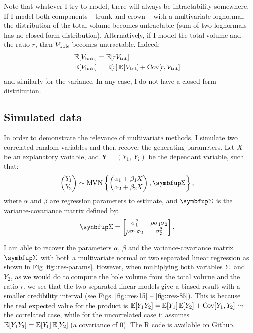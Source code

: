 \begin{tcolorbox}[breakable, title = Intractability]
Note that whatever I try to model, there will always be intractability somewhere. If I model both components -- trunk and crown -- with a multivariate lognormal, the distribution of the total volume becomes untractable (sum of two lognormals has no closed form distribution). Alternatively, if I model the total volume and the ratio \( r \), then \( V_{\text{bole}} \) becomes untractable. Indeed:
\begin{align*}
	\operatorname{\mathbb{E}}[V_{\text{bole}}] &= \operatorname{\mathbb{E}}[r V_{\text{tot}}] \\
	\operatorname{\mathbb{E}}[V_{\text{bole}}] &= \operatorname{\mathbb{E}}[r] \operatorname{\mathbb{E}}[V_{\text{tot}}] + \operatorname{Cov}[r, V_{\text{tot}}]
\end{align*}
and similarly for the variance. In any case, I do not have a closed-form distribution.
\end{tcolorbox}

\subsection{Simulated data}
In order to demonstrate the relevance of multivariate methods, I simulate two correlated random variables and then recover the generating parameters. Let \( X \) be an explanatory variable, and \( \mathbf{Y} = (Y_1, \, Y_2) \) be the dependant variable, such that:
\[
	\begin{pmatrix}
		Y_1 \\
		Y_2
	\end{pmatrix} \sim
	\MVN\left\{ \begin{pmatrix}
		\alpha_1 + \beta_1 X \\
		\alpha_2 + \beta_2 X \\
	\end{pmatrix}, \Sigmabf \right\},
\]
where \( \alpha \) and \( \beta \) are regression parameters to estimate, and \( \Sigmabf \) is the variance-covariance matrix defined by:
\[
	\Sigmabf = \begin{bmatrix}
		\sigma_1^2 & \rho \sigma_1 \sigma_2 \\
		\rho \sigma_1 \sigma_2 & \sigma_2^2
	\end{bmatrix}. \\
\]

I am able to recover the parameters \( \alpha \), \( \beta \) and the variance-covariance matrix \( \Sigmabf \) with both a multivariate normal or two separated linear regression as shown in Fig \ref{fig::res-params}. However, when multiplying both variables \( Y_1 \) and \( Y_2 \), as we would do to compute the bole volume from the total volume and the ratio \( r \), we see that the two separated linear models give a biased result with a smaller credibility interval (see Figs. \ref{fig::res-15} -- \ref{fig::res-85}). This is because the real expected value for the product is \( \operatorname{\mathbb{E}}[Y_1 Y_2] = \operatorname{\mathbb{E}}[Y_1] \operatorname{\mathbb{E}}[Y_2] + \operatorname{Cov}[Y_1, Y_2] \) in the correlated case, while for the uncorrelated case it assumes \( \operatorname{\mathbb{E}}[Y_1 Y_2] = \operatorname{\mathbb{E}}[Y_1] \operatorname{\mathbb{E}}[Y_2] \) (\ie a covariance of \num{0}). The R code is available on \href{https://github.com/amael-ls/emerge/tree/main/communications/cst/2025-10-30/code}{ Github}. \\

